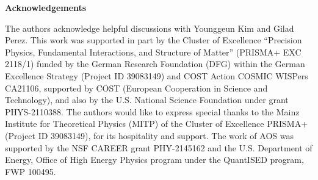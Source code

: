 \documentclass{WileyMSP-template}
\begin{document}
\medskip
\textbf{Acknowledgements} \par %
The authors acknowledge helpful discussions with Younggeun Kim and Gilad Perez. This work was supported in part by the Cluster of Excellence ``Precision Physics, Fundamental Interactions, and Structure of Matter'' (PRISMA+ EXC 2118/1) funded by the German Research Foundation (DFG) within the German Excellence Strategy (Project ID 39083149) and COST Action COSMIC WISPers CA21106, supported by COST (European Cooperation in Science and Technology), and also by the U.S. National Science
Foundation under grant PHYS-2110388. The authors would like to express special thanks to the Mainz Institute for Theoretical Physics (MITP) of the Cluster of Excellence PRISMA+ (Project ID 39083149), for its hospitality and support. The work of AOS was supported by the NSF CAREER grant PHY-2145162 and the U.S. Department of Energy, Office of High Energy Physics program under the QuantISED program, FWP 100495.


\medskip

%











\end{document}
